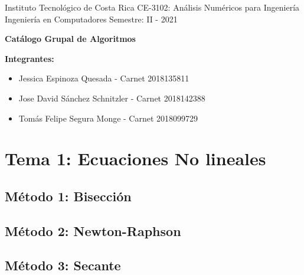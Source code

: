 \documentclass[10pt]{article}
\begin{document}
Instituto Tecnológico de Costa Rica \hfill CE-3102: Análisis Numéricos para Ingeniería\\
Ingeniería en Computadores \hfill Semestre: II - 2021\\

\begin{center}\textbf{\huge Catálogo Grupal de Algoritmos}  \end{center}

{\bf Integrantes: }
\begin{itemize}
\item Jessica Espinoza Quesada - Carnet 2018135811
\item Jose David Sánchez Schnitzler - Carnet 2018142388
\item Tomás Felipe Segura Monge - Carnet 2018099729
\end{itemize}

\section{Tema 1: Ecuaciones No lineales}

\subsection{Método 1: Bisección}
\UseRawInputEncoding


\newpage

\subsection{Método 2: Newton-Raphson}
\UseRawInputEncoding


\newpage

\subsection{Método 3: Secante}
\UseRawInputEncoding

\end{document}
